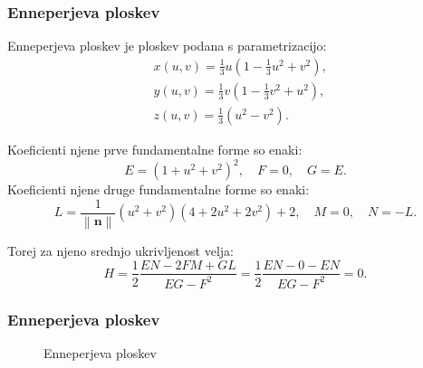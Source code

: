 \documentclass[10pt]{beamer}
\theoremstyle{definition}
\theoremstyle{remark}
\theoremstyle{plain}
\numberwithin{equation}{section}  %
\begin{document}
\begin{frame}
    \frametitle{Enneperjeva ploskev}

    Enneperjeva ploskev je ploskev podana s parametrizacijo:
    $$
    \begin{aligned}
        & x(u,v)=\frac{1}{3} u\left(1-\frac{1}{3} u^2+v^2\right), \\
        & y(u,v)=\frac{1}{3} v\left(1-\frac{1}{3} v^2+u^2\right), \\
        & z(u,v)=\frac{1}{3}\left(u^2-v^2\right).
    \end{aligned}
    $$

    Koeficienti njene prve fundamentalne forme so enaki:
    $$
    E = (1 + u^2 + v^2)^2, \quad F = 0, \quad G = E.
    $$
    Koeficienti njene druge fundamentalne forme so enaki:
    $$
    L = \frac{1}{\left\|\mathbf{n}\right\|}(u^2 + v^2)(4 + 2u^2 + 2v^2) + 2, \quad M = 0, \quad N = -L.
    $$

    Torej za njeno srednjo ukrivljenost velja: 
    $$
    H=\frac{1}{2} \frac{E N-2 F M+G L}{E G-F^2} = \frac{1}{2} \frac{EN - 0 - EN}{EG - F^2} = 0.
    $$
    
\end{frame}

\begin{frame}
    \frametitle{Enneperjeva ploskev}

   \begin{figure}[H]
        \centering

        \caption{Enneperjeva ploskev}
        \label{fig:4}
    \end{figure}
    
\end{frame}
\end{document}
